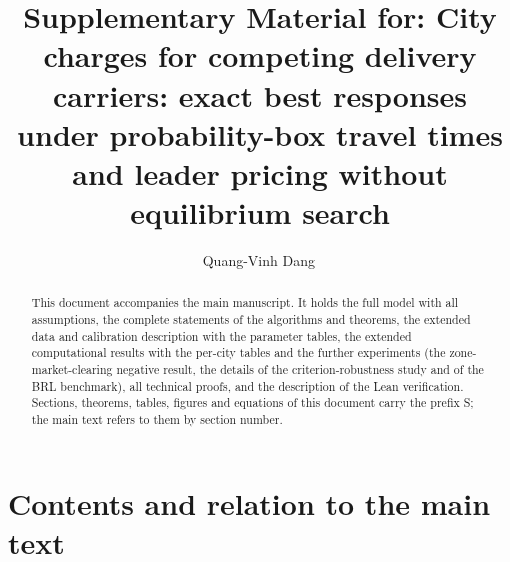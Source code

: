 \documentclass[preprint,11pt]{elsarticle}
\theoremstyle{definition}
\theoremstyle{remark}
\begin{document}
\begin{frontmatter}

\title{Supplementary Material for: City charges for competing delivery carriers: exact best responses under probability-box travel times and leader pricing without equilibrium search}

\author{Quang-Vinh Dang\,}
\address{British University Vietnam, Hung Yen, Vietnam}

\begin{abstract}
This document accompanies the main manuscript. It holds the full model with all assumptions, the complete statements of the algorithms and theorems, the extended data and calibration description with the parameter tables, the extended computational results with the per-city tables and the further experiments (the zone-market-clearing negative result, the details of the criterion-robustness study and of the BRL benchmark), all technical proofs, and the description of the Lean verification. Sections, theorems, tables, figures and equations of this document carry the prefix S; the main text refers to them by section number.
\end{abstract}

\end{frontmatter}

\section*{Contents and relation to the main text}
\end{document}
